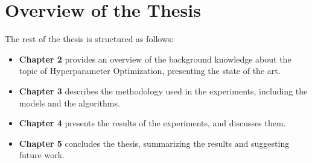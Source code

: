 \section{Overview of the Thesis}

The rest of the thesis is structured as follows:
\begin{itemize}[itemsep=0.1cm]
    \item \textbf{Chapter 2} provides an overview of the background knowledge about the topic of Hyperparameter Optimization, presenting the state of the art.
    \item \textbf{Chapter 3} describes the methodology used in the experiments, including the models and the algorithms.
    \item \textbf{Chapter 4} presents the results of the experiments, and discusses them.
    \item \textbf{Chapter 5} concludes the thesis, summarizing the results and suggesting future work.
\end{itemize}
